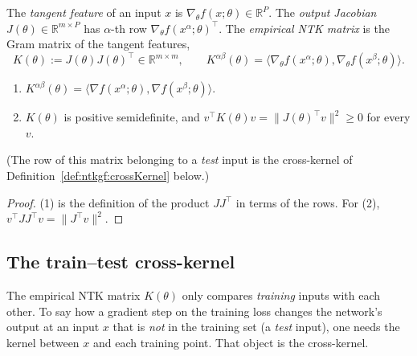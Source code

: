 \begin{definition}\label{def:ntkgf:jacobian}
  \leanok
The \emph{tangent feature} of an input $x$ is $\nabla_\theta f(x;\theta)\in\mathbb R^P$. The \emph{output
Jacobian} $J(\theta)\in\mathbb R^{m\times P}$ has $\alpha$-th row $\nabla_\theta f(x^\alpha;\theta)^\top$. The
\emph{empirical NTK matrix} is the Gram matrix of the tangent features,
\[
  K(\theta):=J(\theta)J(\theta)^\top\in\mathbb R^{m\times m},\qquad
  K^{\alpha\beta}(\theta)=\bigl\langle\nabla_\theta f(x^\alpha;\theta),\nabla_\theta f(x^\beta;\theta)\bigr\rangle .
\]
\end{definition}

\begin{lemma}\label{lem:ntkgf:ntkPsd}
  \leanok
\begin{enumerate}
  \item $K^{\alpha\beta}(\theta)=\langle\nabla f(x^\alpha;\theta),\nabla f(x^\beta;\theta)\rangle$.
  \item $K(\theta)$ is positive semidefinite, and $v^\top K(\theta)v=\|J(\theta)^\top v\|^2\ge0$ for every $v$.
\end{enumerate}
(The row of this matrix belonging to a \emph{test} input is the cross-kernel of Definition~\ref{def:ntkgf:crossKernel} below.)
\end{lemma}

\begin{proof}
  \leanok
(1) is the definition of the product $JJ^\top$ in terms of the rows. For (2), $v^\top JJ^\top v=\|J^\top v\|^2$.
\end{proof}

\subsection{The train--test cross-kernel}\label{sec:ntkgf:crossKernel}

The empirical NTK matrix $K(\theta)$ only compares \emph{training} inputs with each other. To say how a gradient step on the training loss changes the network's output at an input $x$ that is \emph{not} in the training set (a \emph{test} input), one needs the kernel between $x$ and each training point.
That object is the cross-kernel.

